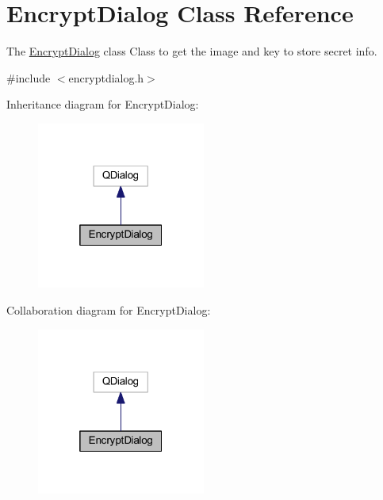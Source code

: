\hypertarget{class_encrypt_dialog}{}\section{Encrypt\+Dialog Class Reference}
\label{class_encrypt_dialog}


The \mbox{\hyperlink{class_encrypt_dialog}{Encrypt\+Dialog}} class Class to get the image and key to store secret info.  




{\ttfamily \#include $<$encryptdialog.\+h$>$}



Inheritance diagram for Encrypt\+Dialog\+:
\nopagebreak
\begin{figure}[H]
\begin{center}
\leavevmode
\includegraphics[width=157pt]{class_encrypt_dialog__inherit__graph}
\end{center}
\end{figure}


Collaboration diagram for Encrypt\+Dialog\+:
\nopagebreak
\begin{figure}[H]
\begin{center}
\leavevmode
\includegraphics[width=157pt]{class_encrypt_dialog__coll__graph}
\end{center}
\end{figure}
